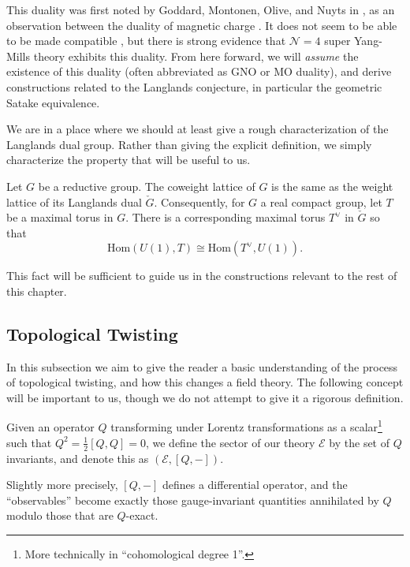 	This duality was first noted by Goddard, Montonen, Olive, and Nuyts in \cite{montonen1977, goddard1977}, as an observation between the duality of magnetic charge . It does not seem to be able to be made compatible , but there is strong evidence that $\mathcal N=4$ super Yang-Mills theory exhibits this duality. From here forward, we will \emph{assume} the existence of this duality (often abbreviated as GNO or MO duality), and derive constructions related to the Langlands conjecture, in particular the geometric Satake equivalence. 
	
	We are in a place where we should at least give a rough characterization of the Langlands dual group. Rather than giving the explicit definition, we simply characterize the property that will be useful to us.
	\begin{fact}
		Let $G$ be a reductive group. The coweight lattice of $G$ is the same as the weight lattice of its Langlands dual $\check G$. Consequently, for $G$ a real compact group, let $T$ be a maximal torus in $G$. There is a corresponding maximal torus $T^\vee$ in $\check G$ so that
		\[
			\mathrm{Hom}(U(1), T) \cong \mathrm{Hom}(T^\vee, U(1)).
		\]
	\end{fact}
	This fact will be sufficient to guide us in the constructions relevant to the rest of this chapter.
	

\subsection{Topological Twisting} %
\label{sub:topological_twisting}

	In this subsection we aim to give the reader a basic understanding of the process of topological twisting, and how this changes a field theory. The following concept will be important to us, though we do not attempt to give it a rigorous definition.
	\begin{phys}[Sector]
		Given an operator $Q$ transforming under Lorentz transformations as a scalar\footnote{More technically in ``cohomological degree 1''.} such that $Q^2 = \frac{1}{2} [Q, Q] = 0$, we define the sector of our theory $\mathcal E$ by the set of $Q$ invariants, and denote this as $(\mathcal E, [Q, -])$.
		
		Slightly more precisely, $[Q, -]$ defines a differential operator, and the ``observables'' become exactly those gauge-invariant quantities annihilated by $Q$ modulo those that are $Q$-exact.
	\end{phys}
	
